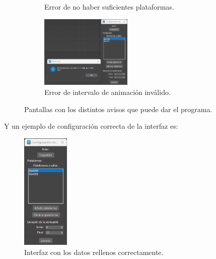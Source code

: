 \begin{figure}[H]
\begin{subfigure}[t]{0.48\textwidth}
    \caption{Error de no haber suficientes plataformas.}
 \end{subfigure}
\par\bigskip
\begin{subfigure}[t]{\textwidth}
    \centering
    \includegraphics[width=0.48\textwidth]{imagenes/error3.png}
    \caption{Error de intervalo de animación inválido.}
 \end{subfigure}
 \caption{Pantallas con los distintos avisos que puede dar el programa.}
\end{figure}

\newpage

Y un ejemplo de configuración correcta de la interfaz es:


\begin{figure}[H]
    \centering
    \includegraphics[width=0.2\textwidth]{imagenes/ui2.png}
    \caption{Interfaz con los datos rellenos correctamente.}
 \end{figure}